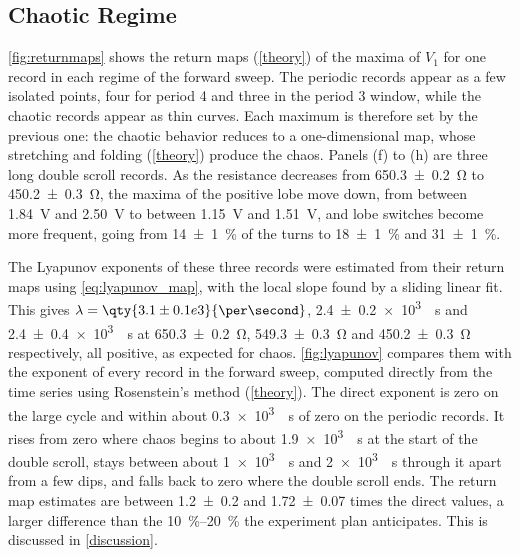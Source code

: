 
\subsection{Chaotic Regime}\label{chaotic}
\cref{fig:returnmaps} shows the return maps (\cref{theory}) of the maxima of $V_1$ for one record in each regime of the forward sweep. The periodic records appear as a few isolated points, four for period 4 and three in the period 3 window, while the chaotic records appear as thin curves. Each maximum is therefore set by the previous one: the chaotic behavior reduces to a one-dimensional map, whose stretching and folding (\cref{theory}) produce the chaos. Panels (f) to (h) are three long double scroll records. As the resistance decreases from \qty{650.3\pm0.2}{\ohm} to \qty{450.2\pm0.3}{\ohm}, the maxima of the positive lobe move down, from between \qty{1.84}{\volt} and \qty{2.50}{\volt} to between \qty{1.15}{\volt} and \qty{1.51}{\volt}, and lobe switches become more frequent, going from \qty{14\pm1}{\percent} of the turns to \qty{18\pm1}{\percent} and \qty{31\pm1}{\percent}.

The Lyapunov exponents of these three records were estimated from their return maps using \cref{eq:lyapunov_map}, with the local slope found by a sliding linear fit. This gives $\lambda=\qty{3.1\pm0.1e3}{\per\second}$, \qty{2.4\pm0.2e3}{\per\second} and \qty{2.4\pm0.4e3}{\per\second} at \qty{650.3\pm0.2}{\ohm}, \qty{549.3\pm0.3}{\ohm} and \qty{450.2\pm0.3}{\ohm} respectively, all positive, as expected for chaos. \cref{fig:lyapunov} compares them with the exponent of every record in the forward sweep, computed directly from the time series using Rosenstein's method (\cref{theory}). The direct exponent is zero on the large cycle and within about \qty{0.3e3}{\per\second} of zero on the periodic records. It rises from zero where chaos begins to about \qty{1.9e3}{\per\second} at the start of the double scroll, stays between about \qty{1e3}{\per\second} and \qty{2e3}{\per\second} through it apart from a few dips, and falls back to zero where the double scroll ends. The return map estimates are between \num{1.2\pm0.2} and \num{1.72\pm0.07} times the direct values, a larger difference than the \qtyrange{10}{20}{\percent} the experiment plan anticipates. This is discussed in \cref{discussion}.


